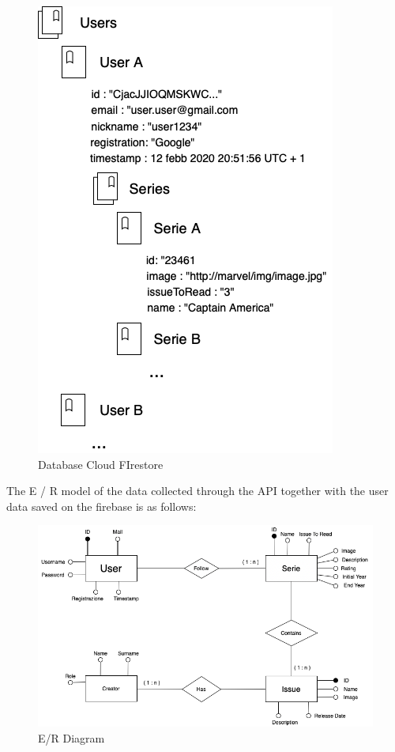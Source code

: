 \begin{figure}[h]
\centering
\includegraphics[scale=0.5]{img/DB}
\caption{Database Cloud FIrestore}
\end{figure}

\clearpage

The E / R model of the data collected through the API together with the user data saved on the firebase is as follows:


\begin{figure}[h]
\centering
\includegraphics[width=\textwidth]{img/ER}
\caption{E/R Diagram}
\end{figure}


